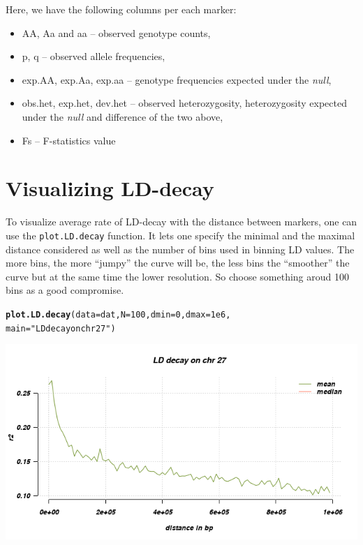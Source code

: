 \documentclass[12pt,a4paper,oneside]{article}\usepackage[]{graphicx}\usepackage[]{color}
\makeatletter
\newcommand{\hlnum}[1]{\textcolor[rgb]{0.686,0.059,0.569}{#1}}%
\newcommand{\hlstr}[1]{\textcolor[rgb]{0.192,0.494,0.8}{#1}}%
\newcommand{\hlstd}[1]{\textcolor[rgb]{0.345,0.345,0.345}{#1}}%
\newcommand{\hlkwc}[1]{\textcolor[rgb]{0.333,0.667,0.333}{#1}}%
\newcommand{\hlkwd}[1]{\textcolor[rgb]{0.737,0.353,0.396}{\textbf{#1}}}%
\newenvironment{kframe}{%
 \def\at@end@of@kframe{}%
 \ifinner\ifhmode%
  \def\at@end@of@kframe{\end{minipage}}%
  \begin{minipage}{\columnwidth}%
 \fi\fi%
 \def\FrameCommand##1{\hskip\@totalleftmargin \hskip-\fboxsep
 \colorbox{shadecolor}{##1}\hskip-\fboxsep
     \hskip-\linewidth \hskip-\@totalleftmargin \hskip\columnwidth}%
 \MakeFramed {\advance\hsize-\width
   \@totalleftmargin\z@ \linewidth\hsize
   \@setminipage}}%
 {\par\unskip\endMakeFramed%
 \at@end@of@kframe}
\newenvironment{knitrout}{}{} %
\makeatother
\begin{document}
Here, we have the following columns per each marker: 
\begin{itemize}
  \item{AA, Aa and aa -- observed genotype counts,}
  \item{p, q -- observed allele frequencies,}
  \item{exp.AA, exp.Aa, exp.aa -- genotype frequencies expected under the \textit{null},}
  \item{obs.het, exp.het, dev.het -- observed heterozygosity, heterozygosity expected under the \textit{null} and difference of the two above,}
  \item{Fs -- F-statistics value}
\end{itemize}

\section*{Visualizing LD-decay}
To visualize average rate of LD-decay with the distance between markers, one can use the \texttt{plot.LD.decay} function. It lets one specify the minimal and the maximal distance considered as well as the number of bins used in binning LD values. The more bins, the more ``jumpy'' the curve will be, the less bins the ``smoother'' the curve but at the same time the lower resolution. So choose something aroud 100 bins as a good compromise.
\begin{knitrout}\footnotesize
{}\color{fgcolor}\begin{kframe}
\begin{alltt}
\hlkwd{plot.LD.decay}\hlstd{(}\hlkwc{data}\hlstd{=dat,} \hlkwc{N}\hlstd{=}\hlnum{100}\hlstd{,} \hlkwc{dmin}\hlstd{=}\hlnum{0}\hlstd{,} \hlkwc{dmax}\hlstd{=}\hlnum{1e6}\hlstd{,}
              \hlkwc{main}\hlstd{=}\hlstr{"LD decay on chr 27"}\hlstd{)}
\end{alltt}
\end{kframe}

{\centering \includegraphics[width=1.0\textwidth]{images/ld_decay} 

}



\end{knitrout}
\end{document}
